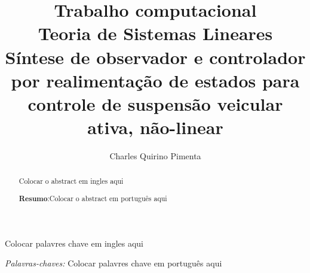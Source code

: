 \documentclass[a4paper]{ifacconf}
\begin{document}
	
	
    \begin{frontmatter}
        
        \title{Trabalho computacional \\Teoria de Sistemas Lineares \\Síntese de observador e controlador por realimentação de estados para controle de suspensão veicular ativa, não-linear} 

        \author[First]{Charles Quirino Pimenta} 
        
        \address[First]{Programa de Pós-Graduação em Engenharia Elétrica - Universidade Federal de 
Minas Gerais - Av. Antônio Carlos 6627, 31270-901, Belo Horizonte, MG, Brasil\\ e-mail:charlesqp@ufmg.br.}
        
        \renewcommand{\abstractname}{{\bf Abstract:~}}
        \begin{abstract} Colocar o abstract em ingles aqui
        
        \vskip 1mm%
        {\noindent \bf Resumo}:Colocar o abstract em português aqui
        \end{abstract}
        
        
        \begin{keyword} Colocar palavres chave em ingles aqui 
        
        \vskip 1mm%
        {\noindent\it Palavras-chaves:} Colocar palavres chave em português aqui 
        \end{keyword}
        
        
        \end{frontmatter}
\end{document}
